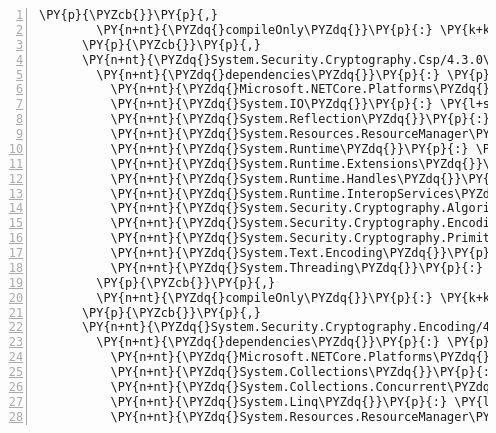 \begin{Verbatim}[commandchars=\\\{\},numbers=left,firstnumber=1,stepnumber=1,numberblanklines=0]
        \PY{p}{\PYZcb{}}\PY{p}{,}
        \PY{n+nt}{\PYZdq{}compileOnly\PYZdq{}}\PY{p}{:} \PY{k+kc}{true}
      \PY{p}{\PYZcb{}}\PY{p}{,}
      \PY{n+nt}{\PYZdq{}System.Security.Cryptography.Csp/4.3.0\PYZdq{}}\PY{p}{:} \PY{p}{\PYZob{}}
        \PY{n+nt}{\PYZdq{}dependencies\PYZdq{}}\PY{p}{:} \PY{p}{\PYZob{}}
          \PY{n+nt}{\PYZdq{}Microsoft.NETCore.Platforms\PYZdq{}}\PY{p}{:} \PY{l+s+s2}{\PYZdq{}2.1.0\PYZhy{}rc1\PYZdq{}}\PY{p}{,}
          \PY{n+nt}{\PYZdq{}System.IO\PYZdq{}}\PY{p}{:} \PY{l+s+s2}{\PYZdq{}4.3.0\PYZdq{}}\PY{p}{,}
          \PY{n+nt}{\PYZdq{}System.Reflection\PYZdq{}}\PY{p}{:} \PY{l+s+s2}{\PYZdq{}4.3.0\PYZdq{}}\PY{p}{,}
          \PY{n+nt}{\PYZdq{}System.Resources.ResourceManager\PYZdq{}}\PY{p}{:} \PY{l+s+s2}{\PYZdq{}4.3.0\PYZdq{}}\PY{p}{,}
          \PY{n+nt}{\PYZdq{}System.Runtime\PYZdq{}}\PY{p}{:} \PY{l+s+s2}{\PYZdq{}4.3.0\PYZdq{}}\PY{p}{,}
          \PY{n+nt}{\PYZdq{}System.Runtime.Extensions\PYZdq{}}\PY{p}{:} \PY{l+s+s2}{\PYZdq{}4.3.0\PYZdq{}}\PY{p}{,}
          \PY{n+nt}{\PYZdq{}System.Runtime.Handles\PYZdq{}}\PY{p}{:} \PY{l+s+s2}{\PYZdq{}4.3.0\PYZdq{}}\PY{p}{,}
          \PY{n+nt}{\PYZdq{}System.Runtime.InteropServices\PYZdq{}}\PY{p}{:} \PY{l+s+s2}{\PYZdq{}4.3.0\PYZdq{}}\PY{p}{,}
          \PY{n+nt}{\PYZdq{}System.Security.Cryptography.Algorithms\PYZdq{}}\PY{p}{:} \PY{l+s+s2}{\PYZdq{}4.3.0\PYZdq{}}\PY{p}{,}
          \PY{n+nt}{\PYZdq{}System.Security.Cryptography.Encoding\PYZdq{}}\PY{p}{:} \PY{l+s+s2}{\PYZdq{}4.3.0\PYZdq{}}\PY{p}{,}
          \PY{n+nt}{\PYZdq{}System.Security.Cryptography.Primitives\PYZdq{}}\PY{p}{:} \PY{l+s+s2}{\PYZdq{}4.3.0\PYZdq{}}\PY{p}{,}
          \PY{n+nt}{\PYZdq{}System.Text.Encoding\PYZdq{}}\PY{p}{:} \PY{l+s+s2}{\PYZdq{}4.3.0\PYZdq{}}\PY{p}{,}
          \PY{n+nt}{\PYZdq{}System.Threading\PYZdq{}}\PY{p}{:} \PY{l+s+s2}{\PYZdq{}4.3.0\PYZdq{}}
        \PY{p}{\PYZcb{}}\PY{p}{,}
        \PY{n+nt}{\PYZdq{}compileOnly\PYZdq{}}\PY{p}{:} \PY{k+kc}{true}
      \PY{p}{\PYZcb{}}\PY{p}{,}
      \PY{n+nt}{\PYZdq{}System.Security.Cryptography.Encoding/4.3.0\PYZdq{}}\PY{p}{:} \PY{p}{\PYZob{}}
        \PY{n+nt}{\PYZdq{}dependencies\PYZdq{}}\PY{p}{:} \PY{p}{\PYZob{}}
          \PY{n+nt}{\PYZdq{}Microsoft.NETCore.Platforms\PYZdq{}}\PY{p}{:} \PY{l+s+s2}{\PYZdq{}2.1.0\PYZhy{}rc1\PYZdq{}}\PY{p}{,}
          \PY{n+nt}{\PYZdq{}System.Collections\PYZdq{}}\PY{p}{:} \PY{l+s+s2}{\PYZdq{}4.3.0\PYZdq{}}\PY{p}{,}
          \PY{n+nt}{\PYZdq{}System.Collections.Concurrent\PYZdq{}}\PY{p}{:} \PY{l+s+s2}{\PYZdq{}4.3.0\PYZdq{}}\PY{p}{,}
          \PY{n+nt}{\PYZdq{}System.Linq\PYZdq{}}\PY{p}{:} \PY{l+s+s2}{\PYZdq{}4.3.0\PYZdq{}}\PY{p}{,}
          \PY{n+nt}{\PYZdq{}System.Resources.ResourceManager\PYZdq{}}\PY{p}{:} \PY{l+s+s2}{\PYZdq{}4.3.0\PYZdq{}}\PY{p}{,}

\end{Verbatim}
